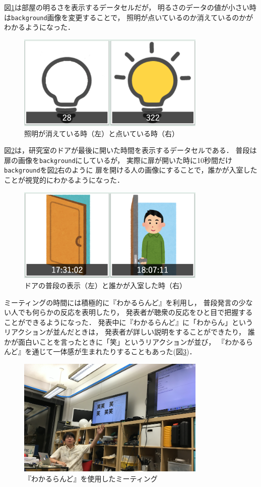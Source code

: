 図\ref{light}は部屋の明るさを表示するデータセルだが，
明るさのデータの値が小さい時は\texttt{background}画像を変更することで，
照明が点いているのか消えているのかがわかるようになった．

\begin{figure}[H]
\centering
\includegraphics[width=9cm]{images/light.png}
\caption{照明が消えている時（左）と点いている時（右）}
\label{light}
\end{figure}

図\ref{door}は，研究室のドアが最後に開いた時間を表示するデータセルである．
普段は扉の画像を\texttt{background}にしているが，
実際に扉が開いた時に10秒間だけ\texttt{background}を図\ref{door}右のように
扉を開ける人の画像にすることで，誰かが入室したことが視覚的にわかるようになった．

\begin{figure}[H]
\centering
\includegraphics[width=9cm]{images/door.png}
\caption{ドアの普段の表示（左）と誰かが入室した時（右）}
\label{door}
\end{figure}

ミーティングの時間には積極的に『わかるらんど』を利用し，
普段発言の少ない人でも何らかの反応を表明したり，
発表者が聴衆の反応をひと目で把握することができるようになった．
発表中に『わかるらんど』に「わからん」というリアクションが並んだときは，
発表者が詳しい説明をすることができたり，
誰かが面白いことを言ったときに「笑」というリアクションが並び，
『わかるらんど』を通じて一体感が生まれたりすることもあった(図\ref{wara})．

\begin{figure}[H]
\centering
\includegraphics[width=9cm]{images/wara.png}
\caption{『わかるらんど』を使用したミーティング}
\label{wara}
\end{figure}

